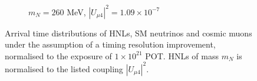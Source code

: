 \begin{figure}[htbp!]
\begin{subfigure}[b]{0.495\textwidth}
            \caption{$m_N = 260$ MeV, $|U_{\mu4}|^2 = 1.09 \times 10^{-7}$ }
        \end{subfigure}
        \caption[Smeared True Arrival Time Distributions in the Mass Range 180 - 260 MeV]{
	Arrival time distributions of HNLs, SM neutrinos and cosmic muons under the assumption of a timing resolution improvement, normalised to the exposure of $1 \times 10^{21}$ POT.
	HNLs of mass $m_N$ is normalised to the listed coupling $|U_{\mu4}|^2$.
	}
\end{figure}
